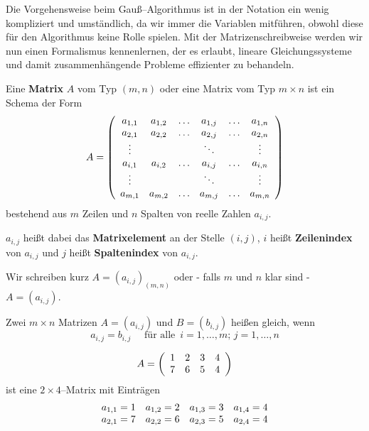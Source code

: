 \setcounter{definition}{0}
\setcounter{beispiel}{0}
\setcounter{notiz}{0}

Die Vorgehensweise beim Gauß--Algorithmus ist in der Notation ein wenig kompliziert und umständlich, da 
wir immer die Variablen mitführen, obwohl diese für den Algorithmus keine Rolle spielen. Mit der 
Matrizenschreibweise werden wir nun einen Formalismus kennenlernen, der es erlaubt, lineare Gleichungssysteme und 
damit zusammenhängende Probleme effizienter zu behandeln.

\begin{definition} Eine \textbf{Matrix} $A$ vom Typ $(m,n)$ oder eine Matrix vom Typ $m \times n$ 
ist ein Schema der Form 
 	$$ A = \left( \begin{array}{c c c c c c }
  	a_{1,1} & a_{1,2} & \ldots & a_{1, j} & \ldots & a_{1,n} \\
   	a_{2,1} & a_{2,2} & \ldots & a_{2, j} & \ldots & a_{2,n} \\ 
   	\vdots  &         &        & \ddots   &        & \vdots \\
   	a_{i,1} & a_{i,2} & \ldots & a_{i, j} & \ldots & a_{i,n} \\
    	\vdots  &         &        & \ddots   &        & \vdots \\
    	a_{m,1} & a_{m,2} & \ldots & a_{m, j} & \ldots & a_{m,n} 
    	\end{array} \right) $$
bestehend aus $m$ Zeilen und $n$ Spalten von reelle Zahlen $a_{i,j}$. 

$a_{i,j}$ heißt dabei  das 
\textbf{Matrixelement} an der Stelle $(i,j)$, $i$ heißt \textbf{Zeilenindex} von $a_{i,j}$ und $j$ 
heißt \textbf{Spaltenindex} von $a_{i,j}$.

Wir schreiben kurz $A = \left( a_{i,j} \right)_{(m,n)}$ oder - falls $m$ und $n$ klar sind - 
$A = \left( a_{i,j} \right)$.

Zwei $m \times n$ Matrizen $A = \left(a_{i,j}\right)$ und $B = \left( b_{i,j} \right)$ heißen gleich, wenn 
  	$$ a_{i,j} = b_{i,j} \quad \textrm{ für alle } \, i = 1, \ldots, m;\, j = 1, \ldots, n $$
\end{definition}


\begin{beispiel}

	$$ A = \left( \begin{array} {c c c c}
      1 & 2 & 3 & 4 \\
      7 & 6 & 5 & 4
      \end{array} \right) $$
ist eine $2 \times 4$--Matrix mit Einträgen
  	$$ \begin{array} {c c c c}
      a_{1,1} = 1 & a_{1,2} = 2 & a_{1,3} = 3 & a_{1,4} = 4 \\
      a_{2,1} = 7 & a_{2,2} = 6 & a_{2,3} = 5 & a_{2,4} = 4
      \end{array} $$
\end{beispiel}

